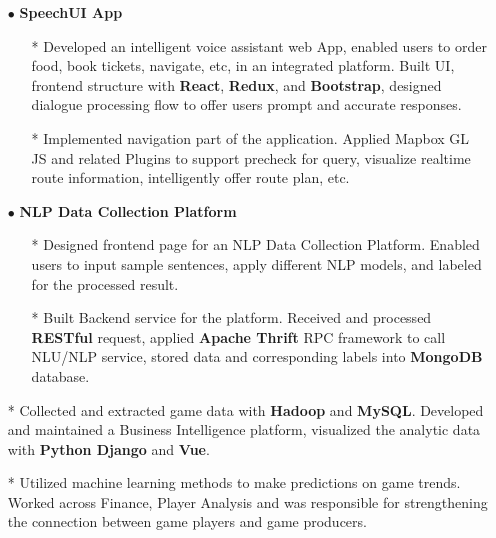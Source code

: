 \documentclass[10pt,letterpaper,sans]{moderncv} %
\begin{document}
\begin{itemize}
    \item[$\bullet$] \textbf{SpeechUI App}
          \begin{itemize}
              \item[*] Developed an intelligent voice assistant web App, enabled users to order food, book tickets, navigate, etc, in an integrated platform. Built UI, frontend structure with \textbf{React}, \textbf{Redux}, and \textbf{Bootstrap}, designed dialogue processing flow to offer users prompt and accurate responses.
              \item[*] Implemented navigation part of the application. Applied Mapbox GL JS and related Plugins to support precheck for query, visualize realtime route information, intelligently offer route plan, etc.
          \end{itemize}
    \item[$\bullet$] \textbf{NLP Data Collection Platform}
          \begin{itemize}
              \item[*] Designed frontend page for an NLP Data Collection Platform. Enabled users to input sample sentences, apply different NLP models, and labeled for the processed result.
              \item[*] Built Backend service for the platform. Received and processed \textbf{RESTful} request, applied \textbf{Apache Thrift} RPC framework to call NLU/NLP service, stored data and corresponding labels into \textbf{MongoDB} database.
          \end{itemize}
\end{itemize}


\begin{itemize}
    \item[*] Collected and extracted game data with \textbf{Hadoop} and \textbf{MySQL}. Developed and maintained a Business Intelligence platform, visualized the analytic data with \textbf{Python Django} and \textbf{Vue}.
    \item[*] Utilized machine learning methods to make predictions on game trends. Worked across Finance, Player Analysis and was responsible for strengthening the connection between game players and game producers.
\end{itemize}

\end{document}
